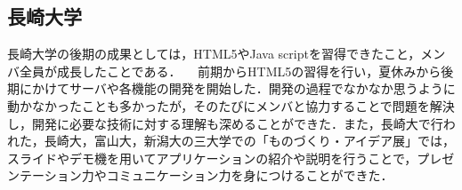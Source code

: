 \subsection{長崎大学}
長崎大学の後期の成果としては，HTML5やJava scriptを習得できたこと，メンバ全員が成長したことである．
　前期からHTML5の習得を行い，夏休みから後期にかけてサーバや各機能の開発を開始した．開発の過程でなかなか思うように動かなかったことも多かったが，そのたびにメンバと協力することで問題を解決し，開発に必要な技術に対する理解も深めることができた．また，長崎大で行われた，長崎大，富山大，新潟大の三大学での「ものづくり・アイデア展」では，スライドやデモ機を用いてアプリケーションの紹介や説明を行うことで，プレゼンテーション力やコミュニケーション力を身につけることができた．
